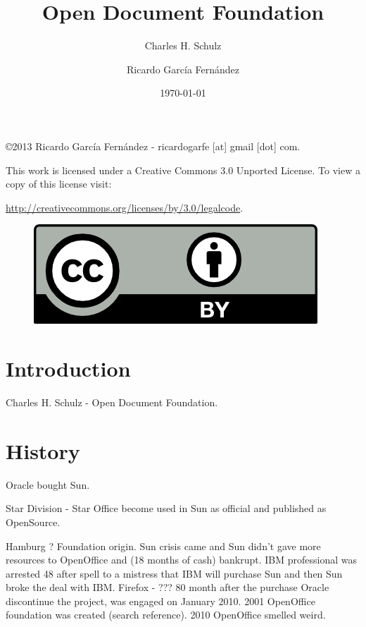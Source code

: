 \documentclass[11pt]{scrartcl}
\title{\textbf{Open Document Foundation}}
\subtitle{Charles H. Schulz}
\author{Ricardo Garc\'ia Fern\'andez}
\date{\today}
\begin{document}
\maketitle

\vfill

\begin{flushright}
    \copyright  2013 Ricardo Garc\'ia Fern\'andez - ricardogarfe [at] gmail [dot] com.

    This work is licensed under a Creative Commons 3.0 Unported License.
    To view a copy of this license visit:
 
    \url{http://creativecommons.org/licenses/by/3.0/legalcode}.
\end{flushright}

\begin{figure}[h]
    \begin{flushright}	
        \includegraphics{by}
        \label{fig:by}
    \end{flushright}
\end{figure}

\newpage

\section{Introduction}
\label{sec:introduction}

Charles H. Schulz - Open Document Foundation.

\section{History}
\label{sec:history}

Oracle bought Sun. 

Star Division - Star Office become used in Sun as official and published as OpenSource.

Hamburg ? Foundation origin.
Sun crisis came and Sun didn't gave more resources to OpenOffice and (18 months of cash) bankrupt. IBM professional was arrested 48 after spell to a mistress that IBM will purchase Sun and then Sun broke the deal with IBM.
Firefox - ??? 
80 month after the purchase Oracle discontinue the project, was engaged on January 2010.
2001 OpenOffice foundation was created (search reference).
2010 OpenOffice smelled weird.
\end{document}
